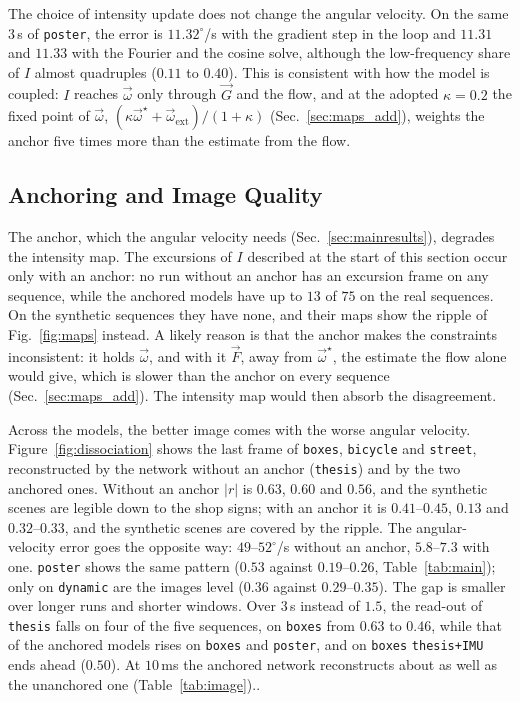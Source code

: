 \documentclass[journal]{IEEEtran}
\newcommand{\Imap}{I}
\newcommand{\Gmap}{\vec{G}}
\newcommand{\Fmap}{\vec{F}}
\newcommand{\wvec}{\vec{\omega}}
\begin{document}
The choice of intensity update does not change the angular velocity. On the same $3$\,s of \texttt{poster}, the error is $11.32^\circ$/s with the gradient step in the loop and $11.31$ and $11.33$ with the Fourier and the cosine solve, although the low-frequency share of $\Imap$ almost quadruples ($0.11$ to $0.40$). This is consistent with how the model is coupled: $\Imap$ reaches $\wvec$ only through $\Gmap$ and the flow, and at the adopted $\kappa = 0.2$ the fixed point of $\wvec$, $(\kappa\wvec^\star + \wvec_{\text{ext}})/(1+\kappa)$ (Sec.~\ref{sec:maps_add}), weights the anchor five times more than the estimate from the flow.

\subsection{Anchoring and Image Quality}
\label{sec:anchor_image}

The anchor, which the angular velocity needs (Sec.~\ref{sec:mainresults}), degrades the intensity map. The excursions of $\Imap$ described at the start of this section occur only with an anchor: no run without an anchor has an excursion frame on any sequence, while the anchored models have up to $13$ of $75$ on the real sequences. On the synthetic sequences they have none, and their maps show the ripple of Fig.~\ref{fig:maps} instead. A likely reason is that the anchor makes the constraints inconsistent: it holds $\wvec$, and with it $\Fmap$, away from $\wvec^\star$, the estimate the flow alone would give, which is slower than the anchor on every sequence (Sec.~\ref{sec:maps_add}). The intensity map would then absorb the disagreement.

Across the models, the better image comes with the worse angular velocity. Figure~\ref{fig:dissociation} shows the last frame of \texttt{boxes}, \texttt{bicycle} and \texttt{street}, reconstructed by the network without an anchor (\texttt{thesis}) and by the two anchored ones. Without an anchor $|r|$ is $0.63$, $0.60$ and $0.56$, and the synthetic scenes are legible down to the shop signs; with an anchor it is $0.41$--$0.45$, $0.13$ and $0.32$--$0.33$, and the synthetic scenes are covered by the ripple. The angular-velocity error goes the opposite way: $49$--$52^\circ$/s without an anchor, $5.8$--$7.3$ with one. \texttt{poster} shows the same pattern ($0.53$ against $0.19$--$0.26$, Table~\ref{tab:main}); only on \texttt{dynamic} are the images level ($0.36$ against $0.29$--$0.35$). The gap is smaller over longer runs and shorter windows. Over $3$\,s instead of $1.5$, the read-out of \texttt{thesis} falls on four of the five sequences, on \texttt{boxes} from $0.63$ to $0.46$, while that of the anchored models rises on \texttt{boxes} and \texttt{poster}, and on \texttt{boxes} \texttt{thesis+IMU} ends ahead ($0.50$). At $10$\,ms the anchored network reconstructs about as well as the unanchored one (Table~\ref{tab:image})..
\end{document}
